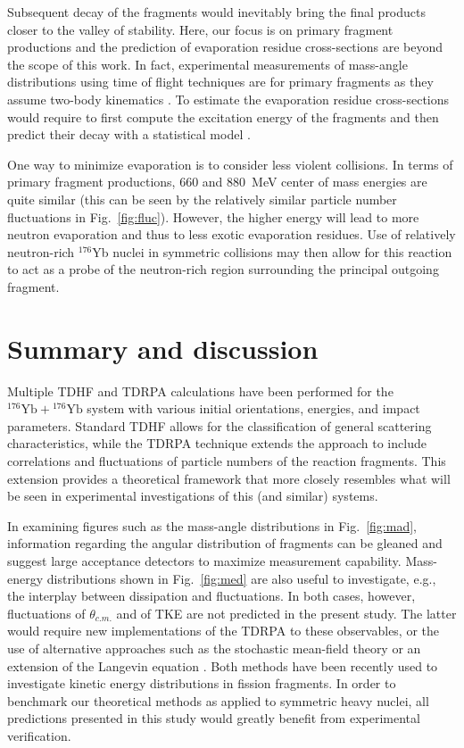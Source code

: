 Subsequent decay of the fragments would inevitably bring the final products closer to the valley of stability.
Here, our focus is on primary fragment productions and the prediction of evaporation residue cross-sections are beyond the scope of this work.
In fact, experimental measurements of mass-angle distributions using time of flight techniques are for primary fragments as they assume two-body kinematics \citep{thomas2008}. 
To estimate the evaporation residue cross-sections would require to first compute the excitation energy of the fragments and then predict their decay with a statistical model \citep{umar2017,sekizawa2017}. 

One way to minimize evaporation is to consider less violent collisions. 
In terms of primary fragment productions, 660 and 880~MeV center of mass energies are quite similar (this can be seen by the relatively similar particle number fluctuations in Fig.~\ref{fig:fluc}). 
However, the higher energy will lead to more neutron evaporation and thus to less exotic evaporation residues. 
Use of relatively neutron-rich $^{176}$Yb nuclei in symmetric collisions may then allow for this reaction to act as a probe of the neutron-rich region surrounding the principal outgoing fragment.


\section{Summary and discussion}\label{sec:conclusions}

Multiple TDHF and TDRPA calculations have been performed for the $^{176}\mathrm{Yb}+{}^{176}\mathrm{Yb}$ system with various initial orientations, energies, and impact parameters.
Standard TDHF allows for the classification of general scattering characteristics, while the TDRPA technique extends the approach to include correlations and fluctuations of particle numbers of the reaction fragments.
This extension provides a theoretical framework that more closely resembles what will be seen in experimental investigations of this (and similar) systems.

In examining figures such as the mass-angle distributions in Fig.~\ref{fig:mad}, information regarding the angular distribution of fragments can be gleaned and suggest large acceptance detectors to maximize measurement capability.
Mass-energy distributions shown in Fig.~\ref{fig:med} are also useful to investigate, e.g., the interplay between dissipation and fluctuations. 
In both cases, however, fluctuations of $\theta_{c.m.}$ and of TKE are not predicted in the present study.
The latter would require new implementations of the TDRPA to these observables, or the use of alternative approaches such as the stochastic mean-field theory \citep{tanimura2017} or an extension of the Langevin equation \citep{bulgac2019}. 
Both methods have been recently used to investigate kinetic energy distributions in fission fragments. 
In order to benchmark our theoretical methods as applied to symmetric heavy nuclei, all predictions presented in this study would greatly benefit from experimental verification.

